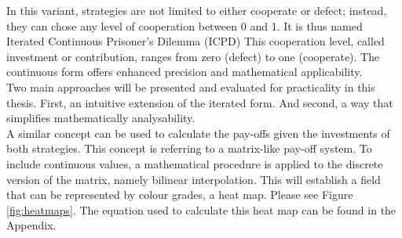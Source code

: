 \documentclass{article}
\begin{document}
In this variant, strategies are not limited to either cooperate or defect; instead, they can chose any level of cooperation between 0 and 1.
It is thus named Iterated Continuous Prisoner's Dilemma (ICPD)
This cooperation level, called investment or contribution, ranges from zero (defect) to one (cooperate).
The continuous form offers enhanced precision and mathematical applicability.\\
%

Two main approaches will be presented and evaluated for practicality in this thesis.
First, an intuitive extension of the iterated form. And second, a way that simplifies mathematically analysability.\\
A similar concept can be used to calculate the pay-offs given the investments of both strategies.
This concept is referring to a matrix-like pay-off system.
To include continuous values, a mathematical procedure is applied to the discrete version of the matrix, namely bilinear interpolation.
This will establish a field that can be represented by colour grades, a heat map.
Please see Figure \ref{fig:heatmaps}.
The equation used to calculate this heat map can be found in the Appendix.
\end{document}
